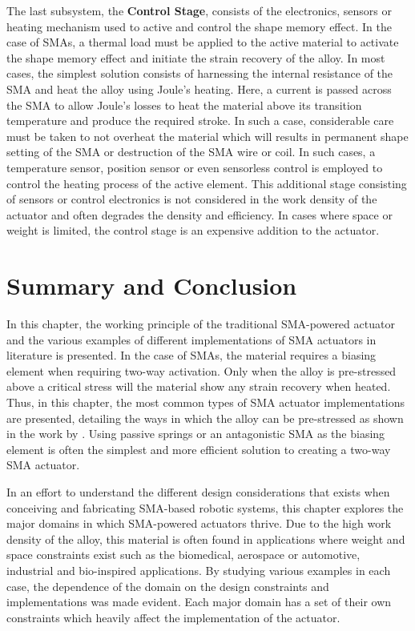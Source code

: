 The last subsystem, the \textbf{Control Stage}, consists of the electronics, sensors or heating mechanism used to active and control the shape memory effect. In the case of SMAs, a thermal load must be applied to the active material to activate the shape memory effect and initiate the strain recovery of the alloy. In most cases, the simplest solution consists of harnessing the internal resistance of the SMA and heat the alloy using Joule's heating. Here, a current is passed across the SMA to allow Joule's losses to heat the material above its transition temperature and produce the required stroke. In such a case, considerable care must be taken to not overheat the material which will results in permanent shape setting of the SMA or destruction of the SMA wire or coil. In such cases, a temperature sensor, position sensor or even sensorless control is employed to control the heating process of the active element. This additional stage consisting of sensors or control electronics is not considered in the work density of the actuator and often degrades the density and efficiency. In cases where space or weight is limited, the control stage is an expensive addition to the actuator.
\section{Summary and Conclusion}
In this chapter, the working principle of the traditional SMA-powered actuator and the various examples of different implementations of SMA actuators in literature is presented. In the case of SMAs, the material requires a biasing element when requiring two-way activation. Only when the alloy is pre-stressed above a critical stress will the material show any strain recovery when heated. Thus, in this chapter, the most common types of SMA actuator implementations are presented, detailing the ways in which the alloy can be pre-stressed as shown in the work by \cite{bellouardShapeMemoryAlloys2008}. Using passive springs or an antagonistic SMA as the biasing element is often the simplest and more efficient solution to creating a two-way SMA actuator.

In an effort to understand the different design considerations that exists when conceiving and fabricating SMA-based robotic systems, this chapter explores the major domains in which SMA-powered actuators thrive. Due to the high work density of the alloy, this material is often found in applications where weight and space constraints exist such as the biomedical, aerospace or automotive, industrial and bio-inspired applications. By studying various examples in each case, the dependence of the domain on the design constraints and implementations was made evident. Each major domain has a set of their own constraints which heavily affect the implementation of the actuator.

